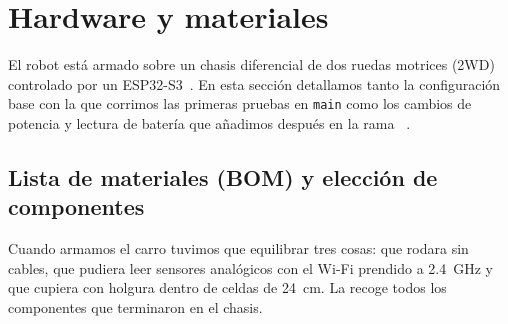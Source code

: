 \section{Hardware y materiales}
\label{sec:hardware}

El robot está armado sobre un chasis diferencial de dos ruedas motrices (2WD) controlado por un ESP32-S3~\cite{espressif2024esp32s3}. En esta sección detallamos tanto la configuración base con la que corrimos las primeras pruebas en \texttt{main} como los cambios de potencia y lectura de batería que añadimos después en la rama ~\cite{repo2026agentelaberinto,arquitectura2026doc}.

\subsection{Lista de materiales (BOM) y elección de componentes}
\label{subsec:bom}

Cuando armamos el carro tuvimos que equilibrar tres cosas: que rodara sin cables, que pudiera leer sensores analógicos con el Wi-Fi prendido a \SI{2.4}{\giga\hertz} y que cupiera con holgura dentro de celdas de \SI{24}{\centi\meter}. La  recoge todos los componentes que terminaron en el chasis.

